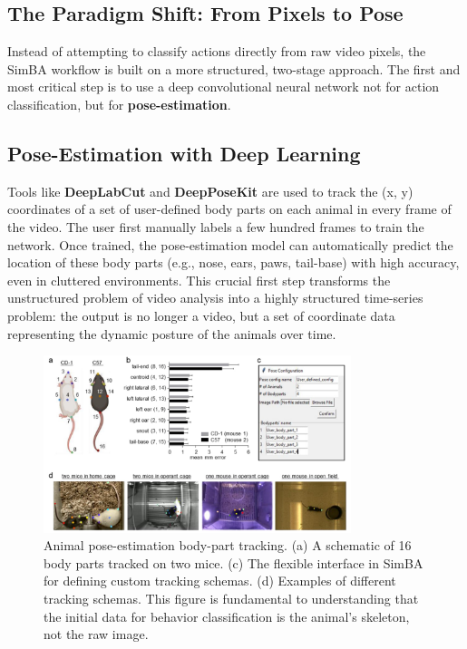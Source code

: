 \subsection{The Paradigm Shift: From Pixels to Pose}

Instead of attempting to classify actions directly from raw video pixels, the SimBA workflow is built on a more structured, two-stage approach. The first and most critical step is to use a deep convolutional neural network not for action classification, but for \textbf{pose-estimation}.

\subsection{Pose-Estimation with Deep Learning}
Tools like \textbf{DeepLabCut} and \textbf{DeepPoseKit} are used to track the (x, y) coordinates of a set of user-defined body parts on each animal in every frame of the video. The user first manually labels a few hundred frames to train the network. Once trained, the pose-estimation model can automatically predict the location of these body parts (e.g., nose, ears, paws, tail-base) with high accuracy, even in cluttered environments. This crucial first step transforms the unstructured problem of video analysis into a highly structured time-series problem: the output is no longer a video, but a set of coordinate data representing the dynamic posture of the animals over time.

\begin{figure}[H]
    \centering
    \includegraphics[width=0.8\textwidth]{archivos/figuras/animal_tracking.jpg} 
    \caption{Animal pose-estimation body-part tracking. (a) A schematic of 16 body parts tracked on two mice. (c) The flexible interface in SimBA for defining custom tracking schemas. (d) Examples of different tracking schemas. This figure is fundamental to understanding that the initial data for behavior classification is the animal's skeleton, not the raw image.}
    \label{fig:pose_estimation}
\end{figure}


